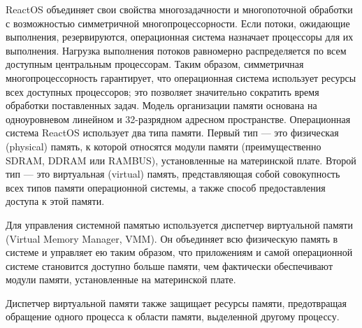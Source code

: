 ReactOS объединяет свои свойства многозадачности и многопоточной обработки с возможностью симметричной многопроцессорности. Если потоки, ожидающие выполнения, резервируются, операционная система назначает процессоры для их выполнения. Нагрузка выполнения потоков равномерно распределяется по всем доступным центральным процессорам. Таким образом, симметричная многопроцессорность гарантирует, что операционная система использует ресурсы всех доступных процессоров; это позволяет значительно сократить время обработки поставленных задач.
Модель организации памяти основана на одноуровневом линейном и 32-разрядном адресном пространстве. Операционная система ReactOS использует два типа памяти. Первый тип — это физическая (physical) память, к которой относятся модули памяти (преимущественно SDRAM, DDRAM или RAMBUS), установленные на материнской плате. Второй тип — это виртуальная (virtual) память, представляющая собой совокупность всех типов памяти операционной системы, а также способ предоставления доступа к этой памяти.

Для управления системной памятью используется диспетчер виртуальной памяти (Virtual Memory Manager, VMM). Он объединяет всю физическую память в системе и управляет ею таким образом, что приложениям и самой операционной системе становится доступно больше памяти, чем фактически обеспечивают модули памяти, установленные на материнской плате.

Диспетчер виртуальной памяти также защищает ресурсы памяти, предотвращая обращение одного процесса к области памяти, выделенной другому процессу.

